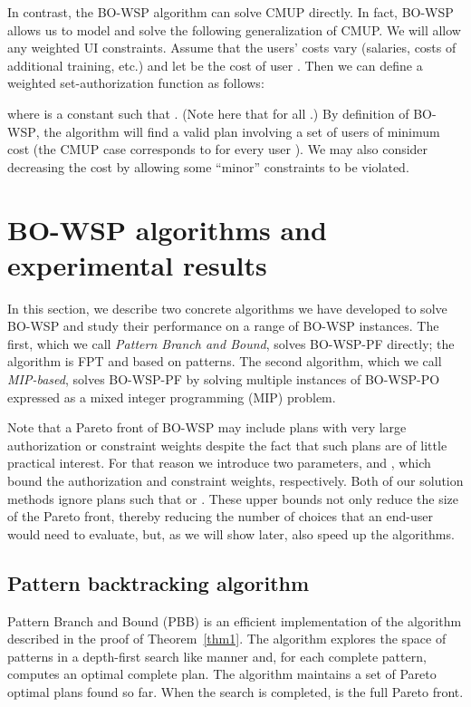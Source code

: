 \documentclass[jcs,crcready]{iosart1c}
\newcommand{\BOWSP}{\textsc{BO-WSP}\xspace}
\newcommand{\BOWSPPO}{\textsc{BO-WSP-PO}\xspace}
\newcommand{\BOWSPPF}{\textsc{BO-WSP-PF}\xspace}
\begin{document}
In contrast, the \BOWSP algorithm can solve CMUP directly.  
In fact, \BOWSP allows us to model and solve the following generalization of CMUP.
We will allow any weighted UI constraints. Assume that the users' costs vary (salaries, costs of additional training, etc.) and let  be the cost of user . Then we can define a weighted set-authorization function as follows:
 
where  is a constant such that . 
(Note here that  for all .)
By definition of \BOWSP, the algorithm will find a valid plan involving a set of users of minimum cost (the CMUP case corresponds to  for every user ). We may also consider decreasing the cost by allowing some ``minor'' constraints to be violated.

\section{\BOWSP algorithms and experimental results}
\label{sec:experiments}

In this section, we describe two concrete algorithms we have developed to solve \BOWSP and study their performance on a range of \BOWSP instances.
The first, which we call \emph{Pattern Branch and Bound}, solves \BOWSPPF directly; the algorithm is FPT and based on patterns.
The second algorithm, which we call \emph{MIP-based}, solves \BOWSPPF by solving multiple instances of \BOWSPPO expressed as a mixed integer programming (MIP) problem.

Note that a Pareto front of \BOWSP may include plans with very large authorization or constraint weights despite the fact that such plans are of little practical interest. 
For that reason we introduce two parameters,  and , which bound the authorization and constraint weights, respectively.  
Both of our solution methods ignore plans  such that  or . 
These upper bounds not only reduce the size of the Pareto front, thereby reducing the number of choices that an end-user would need to evaluate, but, as we will show later, also speed up the algorithms.
 
\subsection{Pattern backtracking algorithm}
 
 Pattern Branch and Bound (PBB) is an efficient implementation of the algorithm described in the proof of Theorem~\ref{thm1}.
 The algorithm explores the space of patterns in a depth-first search like manner and, for each complete pattern, computes an optimal complete plan.
 The algorithm maintains a set  of Pareto optimal plans found so far.
 When the search is completed,  is the full Pareto front.
 
\end{document}
